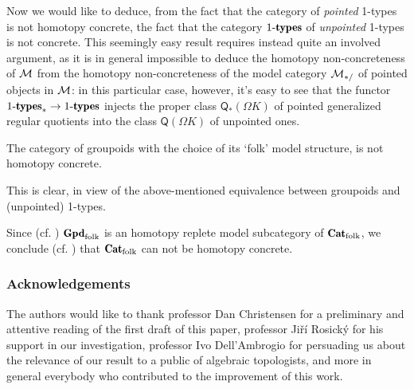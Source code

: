\documentclass[a4paper, 10pt]{amsart}
\begin{document}
Now we would like to deduce, from the fact that the category of \emph{pointed} 1-types is not homotopy concrete, the fact that the category $1\text{-}\cate{types}$ of \emph{unpointed} 1-types is not concrete. This seemingly easy result requires instead quite an involved argument, as it is in general impossible to deduce the homotopy non-concreteness of $\mathcal{M}$ from the homotopy non-concreteness of the model category $\mathcal{M}_{*/}$ of pointed objects in $\mathcal{M}$: in this particular case, however, it's easy to see that the functor $1\text{-}\cate{types}_* \to 1\text{-}\cate{types}$ injects the proper class $\mathsf{Q}_*(\Omega K)$ of pointed generalized regular quotients into the class $\mathsf{Q}(\Omega K)$ of unpointed ones.
\begin{corollary}
The category of groupoids with the choice of its `folk' model structure, is not homotopy concrete.%
\end{corollary}
This is clear, in view of the above-mentioned equivalence between groupoids and (unpointed) 1-types.
\begin{corollary}
Since (cf. ) $\Gpd_\text{folk}$ is an homotopy replete model subcategory of $\Cat_\text{folk}$, we conclude (cf. ) that $\Cat_\text{folk}$ can not be homotopy concrete.
\end{corollary}


\subsubsection*{Acknowledgements}
The authors would like to thank professor Dan Christensen for a preliminary and attentive reading of the first draft of this paper, professor Jiří Rosický for  his support in our investigation, professor Ivo Dell'Ambrogio for persuading us about the relevance of our result to a public of algebraic topologists, and more in general everybody who contributed to the improvement of this work.
 
\hrulefill

{}

\end{document}
